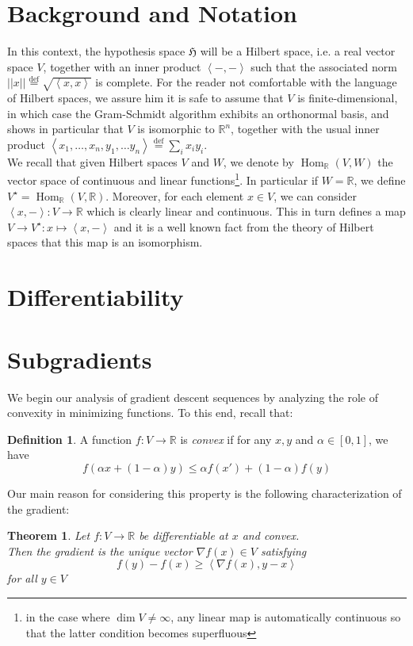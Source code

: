 \documentclass{book}
\theoremstyle{plain}
\newtheorem{theorem}[corollary]{Theorem}
\theoremstyle{definition}
\newtheorem{definition}[corollary]{Definition}
\newcommand{\bl}[2]{\left\langle #1,#2\right\rangle}
\renewcommand{\d}[1]{\mathbb{#1}}
\newcommand{\define}{\stackrel{\operatorname{def}}{=}}
\newcommand{\f}[1]{\mathfrak{#1}}
\newcommand{\norm}[1]{\vert \vert #1 \vert \vert}
\DeclareMathOperator{\Hom}{Hom}
\newcommand{\mor}{\longrightarrow}
\begin{document}
\section{Background and Notation}
In this context, the hypothesis space $\f{H}$ will be a Hilbert space, i.e. a real vector space $V$, together with an inner product $\bl{-}{-}$ such that the associated norm $\norm{x}\define \sqrt{\bl{x}{x}}$  is complete. For the reader not comfortable with the language of Hilbert spaces,  we assure him it is safe to assume that $V$ is finite-dimensional, in which case the Gram-Schmidt algorithm exhibits an orthonormal basis, and shows in particular that  $V$ is isomorphic to $\d{R}^n$, together with the usual inner product $\bl{x_1,\ldots , x_n}{y_1,\ldots y_n}\define \sum_i x_iy_i$.\\

\noindent We recall that given Hilbert spaces $V$ and $W$, we denote by $\Hom_\d{R}(V,W)$ the vector space of continuous and linear functions\footnote{in the case where $\dim V\neq \infty$, any linear map is automatically continuous so that the latter condition becomes superfluous}. In particular if $W=\d{R}$, we define $V^\star=\Hom_{\d{R}}(V,\d{R})$.  Moreover, for each element $x \in V$, we can consider $\bl{x}{-}:V\mor \d{R}$ which is clearly linear and continuous. This in turn defines a map $V\mor V^\star:x\mapsto \bl{x}{-}$ and it is a well known fact from the theory of Hilbert spaces that this map is an isomorphism.\\
\section{Differentiability}

\section{Subgradients}

We begin our analysis of gradient descent sequences by analyzing the role of convexity in minimizing functions. To this end, recall that:
\begin{definition}
A function $f:V\mor \d{R}$ is \emph{convex} if for any $x,y$ and $\alpha \in [0,1]$, we have
\[
f(\alpha x+(1-\alpha)y)\le \alpha f(x')+(1-\alpha)f(y)
\]	
\end{definition}

\noindent Our main reason for considering this property is the following characterization of the gradient:
\begin{theorem}\label{thm:gradient=subgradient}
Let $f:V\mor \d{R}$ be differentiable at $x$ and convex.\\
Then the gradient is the unique vector $\nabla f(x) \in V$ satisfying
\begin{equation}\label{ineq:subgradient}
f(y)-f(x)\ge \bl{\nabla f(x)}{ y-x}
\end{equation}
for all $y \in V$
\end{theorem}
\end{document}
